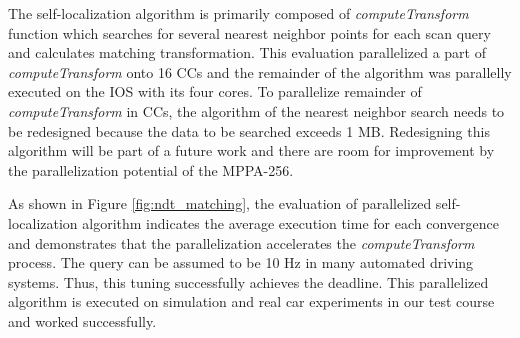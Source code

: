 \documentclass[conference,compsoc]{IEEEtran}
\begin{document}
The self-localization algorithm is primarily composed of \emph{computeTransform} function which searches for several nearest neighbor points for each scan query and calculates matching transformation.
This evaluation parallelized a part of \emph{computeTransform} onto 16 CCs and the remainder of the algorithm was parallelly executed on the IOS with its four cores.
To parallelize remainder of \emph{computeTransform} in CCs, the algorithm of the nearest neighbor search needs to be redesigned because the data to be searched exceeds 1 MB.
Redesigning this algorithm will be part of a future work and there are room for improvement by the parallelization potential of the MPPA-256.

As shown in Figure \ref{fig:ndt_matching}, the evaluation of parallelized self-localization algorithm indicates the average execution time for each convergence and demonstrates that the parallelization accelerates the \emph{computeTransform} process.
The query can be assumed to be 10 Hz in many automated driving systems.
Thus, this tuning successfully achieves the deadline.
This parallelized algorithm is executed on simulation and real car experiments in our test course and worked successfully.

\end{document}
